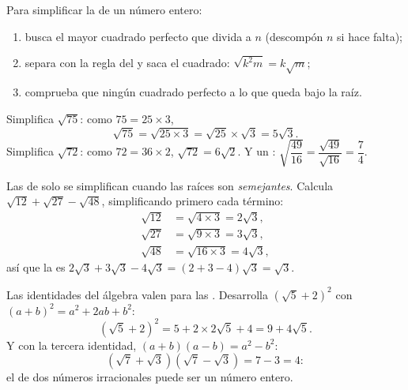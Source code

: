 \begin{method}\label{met:g9:sqrt:simplify}
Para simplificar la  de un número entero:
\begin{enumerate}
  \item busca el mayor cuadrado perfecto que divida a $n$ (descompón $n$ si
        hace falta);
  \item separa con la regla del  y saca el cuadrado:
        $\sqrt{k^2 m} = k\sqrt m$;
  \item comprueba que ningún cuadrado perfecto  a lo que queda bajo la
        raíz.
\end{enumerate}
\end{method}

\begin{example}\label{ex:g9:sqrt:simplify}
Simplifica $\sqrt{75}$: como $75 = 25 \times 3$,
\[
\sqrt{75} = \sqrt{25 \times 3} = \sqrt{25} \times \sqrt 3 = 5\sqrt3 .
\]
Simplifica $\sqrt{72}$: como $72 = 36 \times 2$,
$\sqrt{72} = 6\sqrt2$. Y un :
$\sqrt{\dfrac{49}{16}} = \dfrac{\sqrt{49}}{\sqrt{16}} = \dfrac74$.
\end{example}

\begin{example}\label{ex:g9:sqrt:add}
Las  de  solo se simplifican cuando las raíces son \emph{semejantes}.
Calcula $\sqrt{12} + \sqrt{27} - \sqrt{48}$, simplificando primero cada término:
\begin{align*}
\sqrt{12} &= \sqrt{4 \times 3} = 2\sqrt3, \\
\sqrt{27} &= \sqrt{9 \times 3} = 3\sqrt3, \\
\sqrt{48} &= \sqrt{16 \times 3} = 4\sqrt3,
\end{align*}
así que la  es $2\sqrt3 + 3\sqrt3 - 4\sqrt3 = (2 + 3 - 4)\sqrt3 = \sqrt3$.
\end{example}

\begin{example}\label{ex:g9:sqrt:expand}
Las identidades del álgebra valen para las . Desarrolla
$\left(\sqrt5 + 2\right)^2$ con $(a+b)^2 = a^2 + 2ab + b^2$:
\[
\left(\sqrt5 + 2\right)^2 = 5 + 2 \times 2\sqrt5 + 4 = 9 + 4\sqrt5 .
\]
Y con la tercera identidad, $(a+b)(a-b) = a^2 - b^2$:
\[
\left(\sqrt7 + \sqrt3\right)\left(\sqrt7 - \sqrt3\right) = 7 - 3 = 4 :
\]
el  de dos números irracionales puede ser un número entero.
\end{example}


